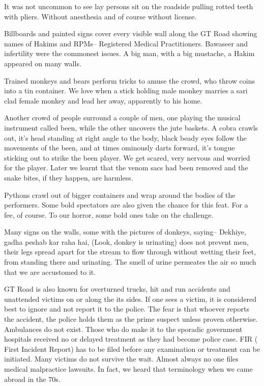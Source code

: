 It was not uncommon to see lay persons sit on the roadside pulling rotted
teeth with pliers. Without anesthesia and of course without license. 

Billboards and painted signs cover every visible wall along the GT Road
showing names of Hakims and RPMs-- Registered Medical Practitioners.
Bawaseer and infertility were the commonest issues. A big man, with a big
mustache, a Hakim appeared on many walls. 

Trained monkeys and bears perform tricks to amuse the crowd, who throw
coins into a tin container. We love when a stick holding male monkey
marries a sari clad female monkey and lead her away, apparently to his
home. 

Another crowd of people surround a couple of men, one playing the musical
instrument called been, while the other uncovers the jute baskets. A cobra
crawls out, it's head standing at right angle to the body, black beady
eyes follow the movements of the been, and at times ominously darts
forward, it's tongue sticking out to strike the been player. We get
scared, very nervous and worried for the player. Later we learnt that the
venom sacs had been removed and the snake bites, if they happen, are
harmless. 

Pythons crawl out of bigger containers and wrap around the bodies of the
performers. Some bold spectators are also given the chance for this feat.
For a fee, of course. To our horror, some bold ones take on the challenge. 

Many signs on the walls, some with the pictures of donkeys, saying--
Dekhiye, gadha peshab kar raha hai, (Look, donkey is urinating) does not
prevent men, their legs spread apart for the stream to flow through
without wetting their feet, from standing there and urinating. The smell
of urine permeates the air so much that we are accustomed to it. 

GT Road is also known for overturned trucks, hit and run accidents and
unattended victims on or along the its sides. If one sees a victim, it is
considered best to ignore and not report it to the police. The fear is
that whoever reports the accident, the police holds them as the prime
suspect unless proven otherwise. Ambulances do not exist. Those who do
make it to the sporadic government hospitals received no or delayed
treatment as they had become police case. FIR ( First Incident Report) has
to be filed before any examination or treatment can be initiated. Many
victims do not survive the wait. Almost always no one files medical
malpractice lawsuits. In fact, we heard that terminology when we came
abroad in the 70s. 


